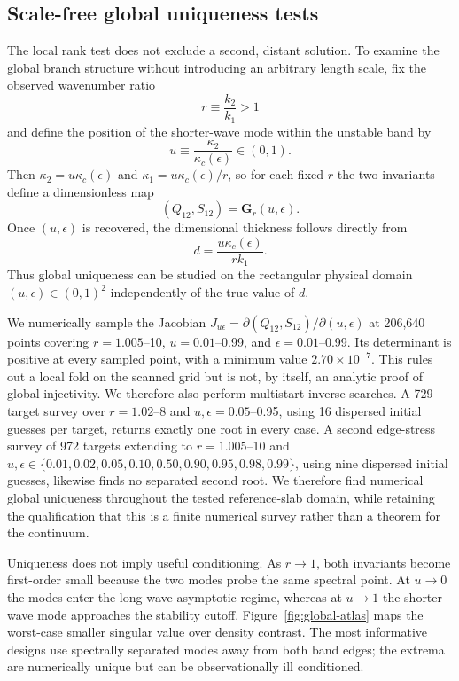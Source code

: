 \documentclass[linenumbers]{aastex7}
\begin{document}
\subsection{Scale-free global uniqueness tests}
The local rank test does not exclude a second, distant solution. To examine the global branch structure without introducing an arbitrary length scale, fix the observed wavenumber ratio
\begin{equation}
r\equiv\frac{k_2}{k_1}>1
\end{equation}
and define the position of the shorter-wave mode within the unstable band by
\begin{equation}
u\equiv\frac{\kappa_2}{\kappa_c(\epsilon)}\in(0,1).
\end{equation}
Then $\kappa_2=u\kappa_c(\epsilon)$ and $\kappa_1=u\kappa_c(\epsilon)/r$, so for each fixed $r$ the two invariants define a dimensionless map
\begin{equation}
(Q_{12},S_{12})=\mathbf{G}_r(u,\epsilon).
\end{equation}
Once $(u,\epsilon)$ is recovered, the dimensional thickness follows directly from
\begin{equation}
d=\frac{u\kappa_c(\epsilon)}{r k_1}.
\end{equation}
Thus global uniqueness can be studied on the rectangular physical domain $(u,\epsilon)\in(0,1)^2$ independently of the true value of $d$.

We numerically sample the Jacobian $J_{u\epsilon}=\partial(Q_{12},S_{12})/\partial(u,\epsilon)$ at 206,640 points covering $r=1.005$--10, $u=0.01$--0.99, and $\epsilon=0.01$--0.99. Its determinant is positive at every sampled point, with a minimum value $2.70\times10^{-7}$. This rules out a local fold on the scanned grid but is not, by itself, an analytic proof of global injectivity. We therefore also perform multistart inverse searches. A 729-target survey over $r=1.02$--8 and $u,\epsilon=0.05$--0.95, using 16 dispersed initial guesses per target, returns exactly one root in every case. A second edge-stress survey of 972 targets extending to $r=1.005$--10 and $u,\epsilon\in\{0.01,0.02,0.05,0.10,0.50,0.90,0.95,0.98,0.99\}$, using nine dispersed initial guesses, likewise finds no separated second root. We therefore find numerical global uniqueness throughout the tested reference-slab domain, while retaining the qualification that this is a finite numerical survey rather than a theorem for the continuum.

Uniqueness does not imply useful conditioning. As $r\rightarrow1$, both invariants become first-order small because the two modes probe the same spectral point. At $u\rightarrow0$ the modes enter the long-wave asymptotic regime, whereas at $u\rightarrow1$ the shorter-wave mode approaches the stability cutoff. Figure~\ref{fig:global-atlas} maps the worst-case smaller singular value over density contrast. The most informative designs use spectrally separated modes away from both band edges; the extrema are numerically unique but can be observationally ill conditioned.
\end{document}

